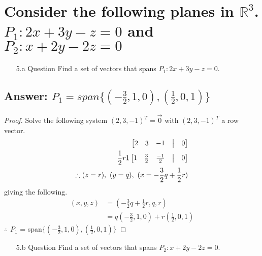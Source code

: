 \documentclass[12pt]{article}
\begin{document}
\section{Consider the following planes in $\mathbb{R}^3$. $P_1: 2x + 3y - z = 0$ and $P_2: x + 2y - 2z = 0$}
\begin{enumerate}
        \item[5.a]Question Find a set of vectors that spans $P_1: 2x + 3y - z = 0$.
\end{enumerate}
\subsection{Answer: $P_1 = span\{(-\frac{3}{2}, 1, 0), (\frac{1}{2}, 0, 1)\}$}
\begin{proof}
        Solve the following system $(2, 3, -1)^{T} = \vec{0}$ with $(2, 3, -1)^{T}$ a row vector.
        \begin{align*}
                \begin{bmatrix}
                        2 & 3 & -1 & \bigm| & 0 \\
                \end{bmatrix}
                \\ \frac{1}{2} r1
                \begin{bmatrix}
                        1 & \frac{3}{2} & \frac{-1}{2} & \bigm| & 0 \\
                \end{bmatrix}
                \\
                \therefore (z=r),\ (y=q),\ (x=-\frac{3}{2}q+\frac{1}{2}r)
        \end{align*}
        giving the following.
        \begin{align*}
                (x,y,z) & = (-\frac{3}{2}q+\frac{1}{2}r, q, r)           \\
                        & = q(-\frac{3}{2}, 1, 0) + r(\frac{1}{2}, 0, 1)
        \end{align*}
        $\therefore$ $P_1$ = span$\{(-\frac{3}{2}, 1, 0), (\frac{1}{2}, 0, 1)\}$
\end{proof}
\begin{enumerate}
        \item[5.b]Question Find a set of vectors that spans $P_2: x + 2y - 2z = 0$.
\end{enumerate}
\end{document}
